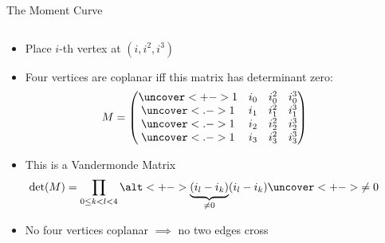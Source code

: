 \documentclass[t]{beamer}
\begin{document}
\begin{frame}{The Moment Curve}
    \vspace{-0.5cm}
    \begin{columns}
	\begin{column}{0.5\textwidth}
		\begin{itemize}
		    \item<+-> Place $i$-th vertex at $(i, i^2, i^3)$
		    \item<+-> Four vertices are coplanar iff this matrix has determinant zero:
			\begin{equation*}
			    M = \begin{pmatrix}
				\uncover<+->{1}&i_0&i_0^2&i_0^3\\
				\uncover<.->{1}&i_1&i_1^2&i_1^3\\
				\uncover<.->{1}&i_2&i_2^2&i_2^3\\
				\uncover<.->{1}&i_3&i_3^2&i_3^3\\
			    \end{pmatrix}
			\end{equation*}
		    \item<+-> This is a Vandermonde Matrix 
			\[\det(M) = \prod_{0 \le k < l < 4} \alt<+->{\underbrace{(i_l - i_k)}_{\neq 0}}{(i_l-i_k)} \uncover<+->{\neq 0}\]
		    \item<+-> No four vertices coplanar \linebreak $\implies$ no two edges cross
		\end{itemize}
	\end{column}
	    \begin{column}{0.5\textwidth}
		\begin{center}
		\end{center}
	    \end{column}
    \end{columns}
\end{frame}
\end{document}
